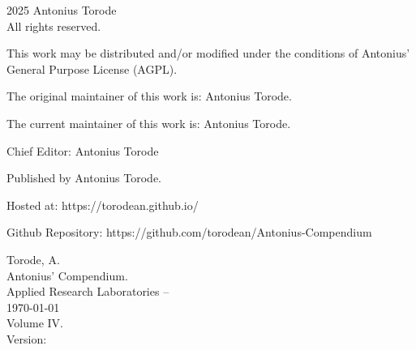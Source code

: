 \pagestyle{empty}
\begingroup
\footnotesize
\parindent 0pt
\parskip \baselineskip
\textcopyright{} 2025 Antonius Torode \\
All rights reserved.

This work may be distributed and/or modified under the conditions of Antonius’ General Purpose License (AGPL).

The original maintainer of this work is: Antonius Torode.

The current maintainer of this work is: Antonius Torode.


Chief Editor: Antonius Torode


Published by Antonius Torode. 

Hosted at: https://torodean.github.io/

Github Repository: https://github.com/torodean/Antonius-Compendium


\vfill

Torode, A.\\
\hspace*{1em} Antonius' Compendium. \\
\hspace*{2em} Applied Research Laboratories -- \\
\hspace*{2em} \today \\
\hspace*{2em} Volume IV. \\
\hspace*{2em} Version: \Version



\endgroup
\clearpage